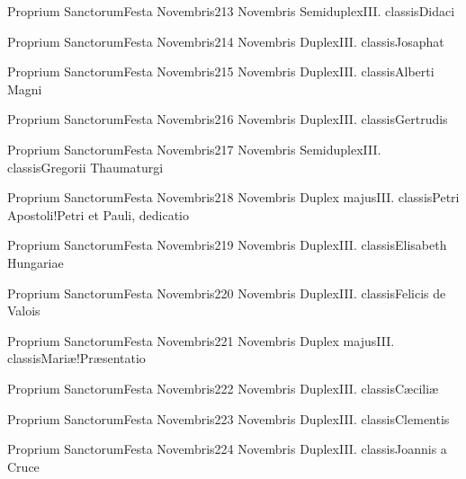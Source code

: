 \documentclass[invitatoriale-romanum.tex]{subfiles}
\begin{document}
	{Proprium Sanctorum}{Festa Novembris}{2}{13 Novembris}
	{Semiduplex}{III. classis}{Didaci}
	{}
	{}

	{Proprium Sanctorum}{Festa Novembris}{2}{14 Novembris}
	{Duplex}{III. classis}{Josaphat}
	{}
	{}

	{Proprium Sanctorum}{Festa Novembris}{2}{15 Novembris}
	{Duplex}{III. classis}{Alberti Magni}
	{}
	{}

	{Proprium Sanctorum}{Festa Novembris}{2}{16 Novembris}
	{Duplex}{III. classis}{Gertrudis}
	{}
	{}

	{Proprium Sanctorum}{Festa Novembris}{2}{17 Novembris}
	{Semiduplex}{III. classis}{Gregorii Thaumaturgi}
	{}
	{}

	{Proprium Sanctorum}{Festa Novembris}{2}{18 Novembris}
	{Duplex majus}{III. classis}{Petri Apostoli!Petri et Pauli, dedicatio}
	{}
	{}

	{Proprium Sanctorum}{Festa Novembris}{2}{19 Novembris}
	{Duplex}{III. classis}{Elisabeth Hungariae}
	{}
	{}

	{Proprium Sanctorum}{Festa Novembris}{2}{20 Novembris}
	{Duplex}{III. classis}{Felicis de Valois}
	{}
	{}

	{Proprium Sanctorum}{Festa Novembris}{2}{21 Novembris}
	{Duplex majus}{III. classis}{Mariæ!Præsentatio}
	{}
	{}

	{Proprium Sanctorum}{Festa Novembris}{2}{22 Novembris}
	{Duplex}{III. classis}{Cæciliæ}
	{}
	{}

	{Proprium Sanctorum}{Festa Novembris}{2}{23 Novembris}
	{Duplex}{III. classis}{Clementis}
	{}
	{}

	{Proprium Sanctorum}{Festa Novembris}{2}{24 Novembris}
	{Duplex}{III. classis}{Joannis a Cruce}
	{}
	{}
\end{document}
